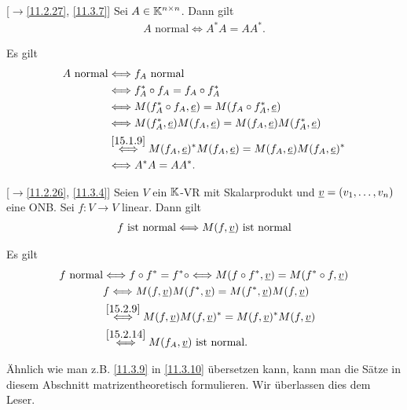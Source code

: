 \documentclass[../../main.tex]{subfiles}
\begin{document}
\begin{pro}\mbox{}[$\to$\ref{11.2.27}, \ref{11.3.7}]
\label{15.2.13}
Sei $A\in \mathbb K^{n\times n}$. Dann gilt
\begin{align*}
A\text{ normal}\Longleftrightarrow A^*A=AA^*.
\end{align*}
\end{pro}
\begin{cproof}
Es gilt
\begin{align*}
A\text{ normal}&\Longleftrightarrow f_A\text{ normal}\\
&\Longleftrightarrow f_A^*\circ f_A=f_A\circ f_A^*\\
&\Longleftrightarrow M(f_A^*\circ f_A,{\underline e})=M(f_A\circ f_A^*,{\underline e})\\
&\Longleftrightarrow M(f_A^*,{\underline e})M(f_A,{\underline e})=M(f_A,{\underline e})M(f_A^*,{\underline e})\\
&\stackrel{\ref{15.1.9}}{\Longleftrightarrow} M(f_A,{\underline e})^*M(f_A,{\underline e})=M(f_A,{\underline e})M(f_A,{\underline e})^*\\
&\Longleftrightarrow A^*A=AA^*.
\end{align*}
\end{cproof}

\begin{pro}\mbox{}[$\to$\ref{11.2.26}, \ref{11.3.4}]
\label{15.2.14}
Seien $V$ ein $\mathbb K$-VR mit Skalarprodukt und ${\underline v}=(v_1,\ldots ,v_n)$ eine ONB. Sei $f: V\to V$ linear. Dann gilt
\begin{align*}
f\text{ ist normal}\Longleftrightarrow M(f,{\underline v})\text{ ist normal}
\end{align*}
\end{pro}
\begin{cproof}
Es gilt
\begin{align*}
f\text{ normal}&\Longleftrightarrow f\circ f^*=f^*\circ \Longleftrightarrow M(f\circ f^*,{\underline v})=M(f^*\circ f,{\underline v})\\
&f\Longleftrightarrow M(f,{\underline v})M(f^*,{\underline v})=M(f^*,{\underline v})M(f,{\underline v})\\
&\stackrel{\ref{15.2.9}}{\Longleftrightarrow} M(f,{\underline v})M(f,{\underline v})^*=M(f,{\underline v})^*M(f,{\underline v})\\
&\stackrel{\ref{15.2.14}}{\Longleftrightarrow}M(f_A,{\underline v})\text{ ist normal}.
\end{align*}		 
\end{cproof}

\noindent Ähnlich wie man z.B. \ref{11.3.9} in \ref{11.3.10} übersetzen kann, kann man die Sätze in diesem Abschnitt matrizentheoretisch formulieren. Wir überlassen dies dem Leser.
\end{document}
